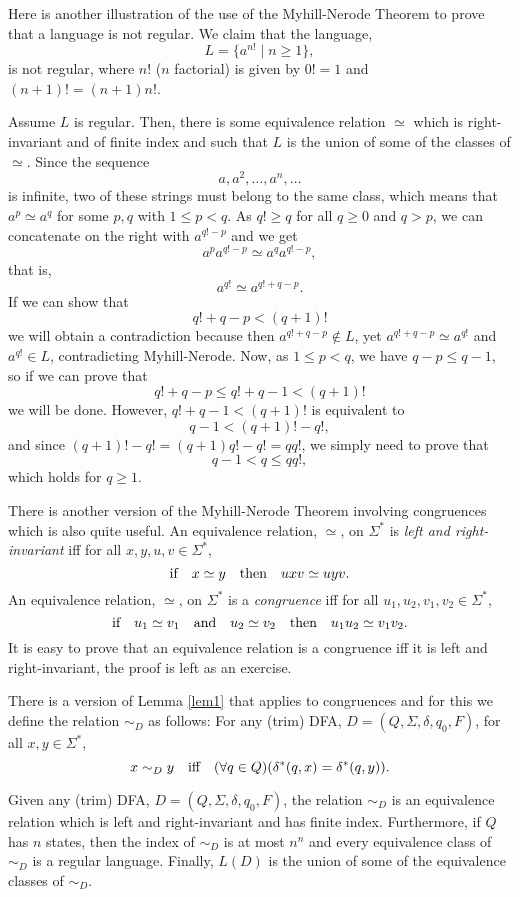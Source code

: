 \medskip
Here is another illustration of the use of the Myhill-Nerode Theorem
to prove that a language is not regular.
We claim that the language,
\[
L = \{a^{n!} \mid n \geq 1\},
\]
is not regular, where $n!$ ($n$ factorial) is given by
$0! = 1$ and $(n+1)! = (n + 1)n!$.

\medskip
Assume $L$ is regular. Then, 
there is some equivalence relation $\simeq$ which is right-invariant
and of finite index and such that $L$ is the union of some of the classes
of $\simeq$. Since the sequence
\[
a, a^2, \ldots, a^n, \ldots
\]
is infinite, two of these strings must belong to the same class, which means
that $a^p \simeq a^q$ for some $p, q$ with $1 \leq p < q$. 
As $q! \geq q$ for all $q \geq 0$ and $q > p$,
we can concatenate on the right with $a^{q! - p}$  and we get
\[
a^{p}a^{q! - p} \simeq a^q a^{q! - p},
\] 
that is, 
\[
a^{q!} \simeq a^{q! + q - p}.
\]
If we can show that 
\[
q! + q - p < (q + 1)!
\]
we will obtain a contradiction because then
$a^{q! + q - p}\notin L$, yet $a^{q! + q - p} \simeq a^{q!}$
and $a^{q!}\in L$, contradicting Myhill-Nerode.
Now, as $1 \leq  p < q$, we have $q - p \leq q - 1$, so if we can prove that
\[
q! + q - p \leq q! + q - 1 < (q + 1)!
\]
we will be done.
However, $q! + q - 1 < (q + 1)!$ is equivalent to
\[
q - 1 < (q + 1)! - q!,
\]
and since $(q + 1)! - q! = (q + 1)q! - q! = qq!$,
we simply need to prove that
\[
q - 1 < q \leq qq!,
\]
which holds for $q \geq 1$.

\medskip
There is another version of the Myhill-Nerode Theorem involving congruences
which is also quite useful. An equivalence relation, $\simeq$,
on $\Sigma^*$ is {\it left and right-invariant\/} iff for all
$x, y, u, v\in \Sigma^*$, 
\[
\hbox{if}\quad x\simeq y\quad\hbox{then}\quad
uxv \simeq uyv. 
\]
An equivalence relation, $\simeq$,
on $\Sigma^*$ is a {\it congruence\/} iff for all
$u_1, u_2, v_1, v_2\in \Sigma^*$, 
\[
\hbox{if}\quad u_1\simeq v_1\quad\hbox{and}\quad u_2\simeq v_2
\quad\hbox{then}\quad
u_1u_2 \simeq v_1v_2. 
\]
It is easy to prove that an equivalence relation is a congruence
iff it is left and right-invariant, the proof is left as an exercise.

\medskip
There is a version of Lemma \ref{lem1} that applies to congruences
and for this we define the relation $\sim_D$ as follows:
For any (trim) DFA, $D = (Q, \Sigma, \delta, q_0, F)$, for all
$x, y\in \Sigma^*$,
\[
x \sim_D y\quad\hbox{iff}\quad
(\forall q\in Q)(\delta^*(q, x) = \delta^*(q, y)).
\]


\begin{lemma}
\label{lem1b}
Given any (trim) DFA, $D = (Q, \Sigma, \delta, q_0, F)$, the relation
$\sim_D$ is an equivalence relation which is left and right-invariant
and has finite index. Furthermore, if $Q$ has $n$ states,
then the index of $\sim_D$ is at most $n^n$ and every equivalence
class of $\sim_D$ is a regular language.
Finally, $L(D)$ is the union of some of the equivalence classes
of $\sim_D$.
\end{lemma}

